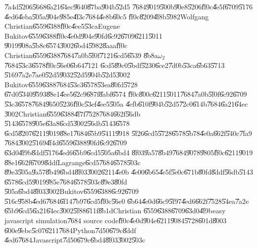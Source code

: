 \documentclass[12pt,a4paper]{article}
\begin{document}
\bigskip

\U{7a4d}\U{5206}\U{5668}\U{6a21}\U{64ec}\U{9640}\U{87ba}\U{904b}\U{52d5}%
\U{7684}\U{9019}\U{500b}\U{90e8}\U{5206}\U{ff0c}\U{4e5f}\U{6709}\U{5176}%
\U{4ed6}\U{4eba}\U{505a}\U{904e}\U{985e}\U{4f3c}\U{7684}\U{4e8b}\U{60c5}%
\U{ff0c}\U{8209}\U{4f8b}\U{5982}Wolfgang Christian\U{6559}\U{6388}\cite%
{wolfgangSimMeth}\U{ff0c}\U{4ee5}\U{53ca}Eugene Bukitov\U{6559}\U{6388}\cite%
{eugene}\U{ff0c}\U{4e0d}\U{904e}\U{90fd}\U{6c92}\U{6709}\U{6211}\U{5011}%
\U{9019}\U{908a}\U{5b8c}\U{6574}\U{3002}\U{6bd4}\U{5982}\U{8aaa}\U{ff0c}%
Christian\U{6559}\U{6388}\U{7684}\U{7a0b}\U{5f0f}\U{7121}\U{6cd5}\U{6539}%
\U{8b8a}$\omega _{2}$\U{7684}\U{53c3}\U{6578}\U{ff0c}\U{56e0}\U{6b64}\U{7121}%
\U{6cd5}\U{89c0}\U{5bdf}\U{5230}\U{6ce2}\U{7d0b}\U{53ca}\U{6b63}\U{5713}%
\U{5169}\U{7a2e}\U{7ae0}\U{52d5}\U{9032}\U{52d5}\U{904b}\U{52d5}\U{3002}%
Bukitov\U{6559}\U{6388}\U{7684}\U{53c3}\U{6578}\U{53ea}\U{80fd}\U{5728}%
\U{67d0}\U{5340}\U{9593}\U{88e1}\U{4ee5}\U{62c9}\U{687f}\U{8abf}\U{6574}%
\U{ff0c}\U{800c}\U{6211}\U{5011}\U{7684}\U{7a0b}\U{5f0f}\U{6c92}\U{6709}%
\U{53c3}\U{6578}\U{7684}\U{9650}\U{5236}\U{ff0c}\U{53ef}\U{4ee5}\U{505a}%
\U{4efb}\U{610f}\U{904b}\U{52d5}\U{72c0}\U{614b}\U{7684}\U{6a21}\U{64ec}%
\U{3002}Christian\U{6559}\U{6388}\U{4f7f}\U{7528}\U{7684}\U{662f}\U{56db}%
\U{5143}\U{6578}\U{905e}\U{63a8}\U{6cd5}\U{3002}\U{56db}\U{5143}\U{6578}%
\U{6cd5}\U{8207}\U{6211}\U{9019}\U{88e1}\U{7684}\U{65b9}\U{5411}\U{9918}%
\U{5f26}\U{6cd5}\U{5728}\U{6578}\U{5b78}\U{4e0a}\U{662f}\U{540c}\U{7fa9}%
\U{7684}\U{3002}\U{5169}\U{4f4d}\U{6559}\U{6388}\U{90fd}\U{6c92}\U{6709}%
\U{63d0}\U{4f9b}\U{8ddf}\U{5176}\U{4ed6}\U{65b9}\U{6cd5}\U{505a}\U{6bd4}%
\U{8f03}\U{9a57}\U{8b49}\U{7684}\U{9078}\U{9805}\U{ff0c}\U{6211}\U{9019}%
\U{88e1}\U{662f}\U{6709}\U{8ddf}Lagrange\U{6cd5}\U{7684}\U{6578}\U{503c}%
\U{89e3}\U{505a}\U{9a57}\U{8b49}\U{6bd4}\U{8f03}\U{3002}\U{6211}\U{4e0b}%
\U{4e00}\U{6b65}\U{4e5f}\U{5e0c}\U{671b}\U{80fd}\U{8ddf}\U{56db}\U{5143}%
\U{6578}\U{6cd5}\U{9019}\U{985e}\U{7684}\U{6578}\U{503c}\U{89e3}\U{80fd}%
\U{505a}\U{6bd4}\U{8f03}\U{3002}Bukitov\U{6559}\U{6388}\U{6c92}\U{6709}%
\U{516c}\U{958b}\U{4ed6}\U{7684}\U{6f14}\U{7b97}\U{6cd5}\U{ff0c}\U{56e0}%
\U{6b64}\U{4e0d}\U{66c9}\U{5f97}\U{4ed6}\U{662f}\U{7528}\U{54ea}\U{7a2e}%
\U{65b9}\U{6cd5}\U{6a21}\U{64ec}\U{3002}\U{5f88}\U{611f}\U{8b1d}Christian%
\U{6559}\U{6388}\U{6709}\U{63d0}\U{4f9b}easy javascript simulation\U{7684}%
source code\U{ff0c}\U{4e0d}\U{904e}\U{6211}\U{9084}\U{5728}\U{601d}\U{8003}%
\U{600e}\U{9ebc}\U{5c07}\U{6211}\U{7684}Python\U{7d50}\U{679c}\U{8ddf}%
\U{4ed6}\U{7684}Javascript\U{7d50}\U{679c}\U{6bd4}\U{8f03}\U{3002}\U{503c}%
\end{document}
